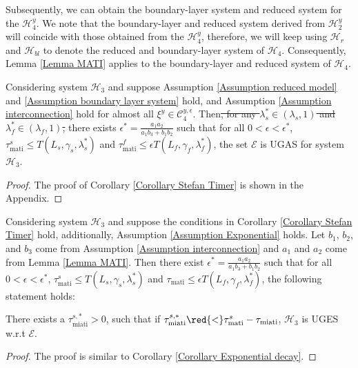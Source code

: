 {Subsequently, we can obtain the boundary-layer system and reduced system for the $\mathcal{H}_4^y$. We note that the boundary-layer and reduced system derived from $\mathcal{H}_2^y$ will coincide with those obtained from the $\mathcal{H}_4^y$, therefore, we will keep using $\mathcal{H}_r$ and $\mathcal{H}_{bl}$ to denote the reduced and boundary-layer system of $\mathcal{H}_4$. Consequently, Lemma \ref{Lemma MATI} applies to the boundary-layer and reduced system of $\mathcal{H}_4$.
%
\begin{corollary}
Considering system $\mathcal{H}_3$ and suppose Assumption \ref{Assumption reduced model} and \ref{Assumption boundary layer system} hold, and Assumption \ref{Assumption interconnection} hold for almost all $\xi^y \in \mathcal{C}_4^{y,\epsilon}$.
%
Then\sout{, for any $\lambda_s^* \in (\lambda_s,1)$ and $\lambda_f^* \in (\lambda_f, 1)$,} there exists $\epsilon^*  = \tfrac{a_1 a_2}{a_1 b_3 + b_1 b_2}$ such that for all $0<\epsilon<\epsilon^*$, $\tau_{\text{mati}}^s \leq T(L_s, \gamma_s, \lambda_s^*)$ and $\tau_{\text{mati}}^f \leq \epsilon T(L_f, \gamma_f,\lambda_f^*)$, the set $\mathcal{E}$ is UGAS for system $\mathcal{H}_3$. 
\label{Corollary Stefan Timer}
\end{corollary}
\begin{proof}
    The proof of Corollary \ref{Corollary Stefan Timer} is shown in the Appendix.
\end{proof}


\begin{corollary}
Considering system $\mathcal{H}_3$ and suppose the conditions in Corollary \ref{Corollary Stefan Timer} hold, additionally, Assumption \ref{Assumption Exponential} holds. Let $b_1$, $b_2$, and $b_3$ come from Assumption \ref{Assumption interconnection} and $a_1$ and $a_2$ come from Lemma \ref{Lemma MATI}. Then there exist $\epsilon^* = \tfrac{a_1 a_2}{a_1 b_3 + b_1 b_2} $ such that for all $0<\epsilon<\epsilon^*$, $\tau_{\text{mati}}^s \leq T(L_s, \gamma_s, \lambda_s^*)$ and $\tau_{\text{mati}} \leq \epsilon T(L_f, \gamma_f,\lambda_f^*)$, the following statement holds:

There exists a $\tau_{\text{miati}}^{s,*} > 0$, such that if $\tau_{\text{miati}}^{s,*} \red{<} \tau_{\text{mati}}^s - \tau_{\text{miati}}$, $\mathcal{H}_3$ is UGES w.r.t $\mathcal{E}$.
\label{Corollary Stefan Exponential decay}
\end{corollary}
\begin{proof}
    The proof is similar to Corollary \ref{Corollary Exponential decay}.
\end{proof}
}
